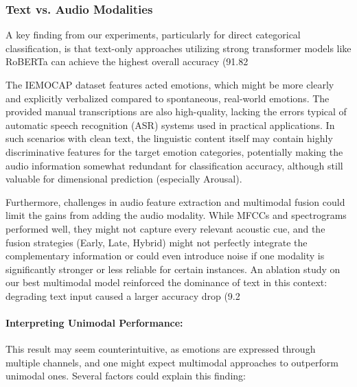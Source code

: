\documentclass[12pt]{article}
\begin{document}
\subsubsection{Text vs. Audio Modalities}
A key finding from our experiments, particularly for direct categorical classification, is that text-only approaches utilizing strong transformer models like RoBERTa can achieve the highest overall accuracy (91.82%

The IEMOCAP dataset features acted emotions, which might be more clearly and explicitly verbalized compared to spontaneous, real-world emotions. The provided manual transcriptions are also high-quality, lacking the errors typical of automatic speech recognition (ASR) systems used in practical applications. In such scenarios with clean text, the linguistic content itself may contain highly discriminative features for the target emotion categories, potentially making the audio information somewhat redundant for classification accuracy, although still valuable for dimensional prediction (especially Arousal).

Furthermore, challenges in audio feature extraction and multimodal fusion could limit the gains from adding the audio modality. While MFCCs and spectrograms performed well, they might not capture every relevant acoustic cue, and the fusion strategies (Early, Late, Hybrid) might not perfectly integrate the complementary information or could even introduce noise if one modality is significantly stronger or less reliable for certain instances. An ablation study on our best multimodal model reinforced the dominance of text in this context: degrading text input caused a larger accuracy drop (9.2%

\paragraph{Interpreting Unimodal Performance:}
This result may seem counterintuitive, as emotions are expressed through multiple channels, and one might expect multimodal approaches to outperform unimodal ones. Several factors could explain this finding:
\end{document}
